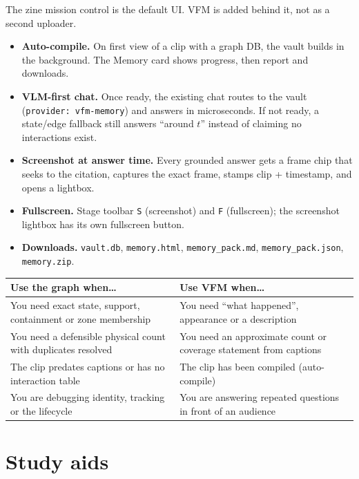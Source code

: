 \documentclass[10pt,a4paper]{article}
\makeatletter
\newcommand{\code}[1]{\texttt{\small #1}}
\newcommand{\needspace}[1]{%
  \par\penalty-100
  \begingroup
  \dimen@=#1\relax
  \ifdim\pagegoal<\maxdimen
    \advance\dimen@\pagetotal
    \ifdim\dimen@>\pagegoal
      \vfil\break
    \fi
  \fi
  \endgroup}
\makeatother
\begin{document}
The zine mission control is the default UI. VFM is added behind it, not as a second uploader.

\begin{itemize}[leftmargin=1.2em,itemsep=1pt]
  \item \textbf{Auto-compile.} On first view of a clip with a graph DB, the vault builds in the
        background. The Memory card shows progress, then report and downloads.
  \item \textbf{VLM-first chat.} Once ready, the existing chat routes to the vault
        (\code{provider: vfm-memory}) and answers in microseconds. If not ready, a state/edge
        fallback still answers ``around $t$'' instead of claiming no interactions exist.
  \item \textbf{Screenshot at answer time.} Every grounded answer gets a frame chip that seeks to the
        citation, captures the exact frame, stamps clip + timestamp, and opens a lightbox.
  \item \textbf{Fullscreen.} Stage toolbar \code{S} (screenshot) and \code{F} (fullscreen); the
        screenshot lightbox has its own fullscreen button.
  \item \textbf{Downloads.} \code{vault.db}, \code{memory.html}, \code{memory\_pack.md},
        \code{memory\_pack.json}, \code{memory.zip}.
\end{itemize}

\begin{center}
\small
\begin{tabularx}{\linewidth}{@{}L L@{}}
\toprule
\textbf{Use the graph when\ldots} & \textbf{Use VFM when\ldots} \\
\midrule
You need exact state, support, containment or zone membership &
You need ``what happened'', appearance or a description \\
You need a defensible physical count with duplicates resolved &
You need an approximate count or coverage statement from captions \\
The clip predates captions or has no interaction table &
The clip has been compiled (auto-compile) \\
You are debugging identity, tracking or the lifecycle &
You are answering repeated questions in front of an audience \\
\bottomrule
\end{tabularx}
\end{center}

\needspace{9\baselineskip}
\part{Study aids}
\end{document}
